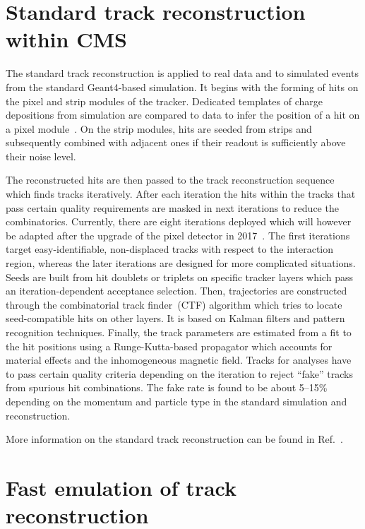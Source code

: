 \section{Standard track reconstruction within CMS}


The standard track reconstruction is applied to real data and to simulated events from the standard Geant4-based simulation. It begins with the forming of hits on the pixel and strip modules of the tracker. Dedicated templates of charge depositions from simulation are compared to data to infer the position of a hit on a pixel module~\cite{Swartz:2007zz}. On the strip modules, hits are seeded from strips and subsequently combined with adjacent ones if their readout is sufficiently above their noise level.

The reconstructed hits are then passed to the track reconstruction sequence which finds tracks iteratively. After each iteration the hits within the tracks that pass certain quality requirements are masked in next iterations to reduce the combinatorics. Currently, there are eight iterations deployed which will however be adapted after the upgrade of the pixel detector in 2017~\cite{Dominguez:1481838}. The first iterations target easy-identifiable, non-displaced tracks with respect to the interaction region, whereas the later iterations are designed for more complicated situations. Seeds are built from hit doublets or triplets on specific tracker layers which pass an iteration-dependent acceptance selection. Then, trajectories are constructed through the combinatorial track finder~(CTF) algorithm which tries to locate seed-compatible hits on other layers. It is based on Kalman filters and pattern recognition techniques.  Finally, the track parameters are estimated from a fit to the hit positions using a Runge-Kutta-based propagator which accounts for material effects and the inhomogeneous magnetic field. Tracks for analyses have to pass certain quality criteria depending on the iteration to reject ``fake'' tracks from spurious hit combinations. The fake rate is found to be about 5--15\% depending on the momentum and particle type in the standard simulation and reconstruction.

More information on the standard track reconstruction can be found in Ref.~\cite{Chatrchyan:2014fea}.


\section{Fast emulation of track reconstruction}

